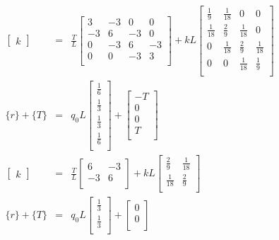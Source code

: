 \documentclass[a4paper]{article}
\begin{document}
\begin{eqnarray*}
\begin{bmatrix}
k
\end{bmatrix} & = & \frac{T}{L}
\begin{bmatrix}
3 & -3 & 0 & 0\\
-3 & 6 & -3 & 0\\
0 & -3 & 6 & -3\\
0 & 0 & -3 & 3\\
\end{bmatrix} +
kL
\begin{bmatrix}
\frac{1}{9} & \frac{1}{18} & 0 & 0 \\[3pt]
\frac{1}{18} & \frac{2}{9} & \frac{1}{18} & 0 \\[3pt]
0 & \frac{1}{18} & \frac{2}{9} & \frac{1}{18} \\[3pt]
0 & 0 & \frac{1}{18} & \frac{1}{9} \\[3pt]
\end{bmatrix}\\
\{ r \} + \{ T \} & = &
q_{0}L
\begin{bmatrix}
\frac{1}{6} \\[3pt]
\frac{1}{3} \\[3pt]
\frac{1}{3} \\[3pt]
\frac{1}{6} \\[3pt]
\end{bmatrix}
+ 
\begin{bmatrix}
-T \\[3pt]
0 \\[3pt]
0 \\[3pt]
T \\[3pt]
\end{bmatrix}\\
\begin{bmatrix}
k
\end{bmatrix} & = & \frac{T}{L}
\begin{bmatrix}
 6 & -3\\
 -3 & 6\\
\end{bmatrix} +
kL
\begin{bmatrix}
\frac{2}{9} & \frac{1}{18}\\[3pt]
\frac{1}{18} & \frac{2}{9}\\[3pt]
\end{bmatrix}\\
\{ r \} + \{ T \} & = &
q_{0}L
\begin{bmatrix}
\frac{1}{3} \\[3pt]
\frac{1}{3} \\[3pt]
\end{bmatrix}
+ 
\begin{bmatrix}
0 \\[3pt]
0 \\[3pt]
\end{bmatrix}
\end{eqnarray*}
\end{document}
